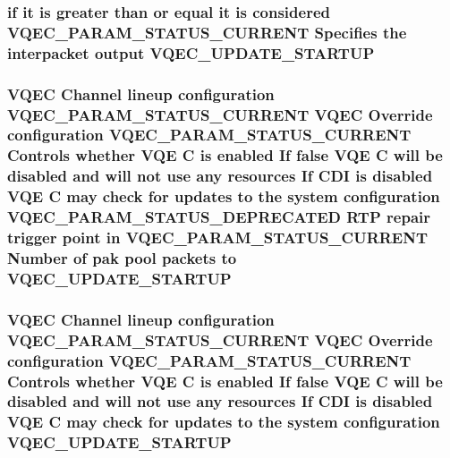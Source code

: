 \subsubsection{\setlength{\rightskip}{0pt plus 5cm}if it is greater than or equal it is considered VQEC\_\-PARAM\_\-STATUS\_\-CURRENT Specifies the interpacket output \bf{VQEC\_\-UPDATE\_\-STARTUP}}\label{vqec__cfg__settings_8h_9a395c44988aab7aa4d387060d3060cb}


\subsubsection{\setlength{\rightskip}{0pt plus 5cm}VQEC Channel lineup configuration VQEC\_\-PARAM\_\-STATUS\_\-CURRENT VQEC Override configuration VQEC\_\-PARAM\_\-STATUS\_\-CURRENT Controls whether VQE \bf{C} is enabled If false VQE \bf{C} will be disabled and will not use any resources If CDI is disabled VQE \bf{C} may check for updates \bf{to} the system configuration VQEC\_\-PARAM\_\-STATUS\_\-DEPRECATED RTP repair trigger point in VQEC\_\-PARAM\_\-STATUS\_\-CURRENT Number of pak pool packets \bf{to} \bf{VQEC\_\-UPDATE\_\-STARTUP}}\label{vqec__cfg__settings_8h_7c847a5a0137d68bd60bf24c0ece08b0}


\subsubsection{\setlength{\rightskip}{0pt plus 5cm}VQEC Channel lineup configuration VQEC\_\-PARAM\_\-STATUS\_\-CURRENT VQEC Override configuration VQEC\_\-PARAM\_\-STATUS\_\-CURRENT Controls whether VQE \bf{C} is enabled If false VQE \bf{C} will be disabled and will not use any resources If CDI is disabled VQE \bf{C} may check for updates \bf{to} the system configuration \bf{VQEC\_\-UPDATE\_\-STARTUP}}\label{vqec__cfg__settings_8h_c0fe883c4b63474e3fa8660a66d98473}


